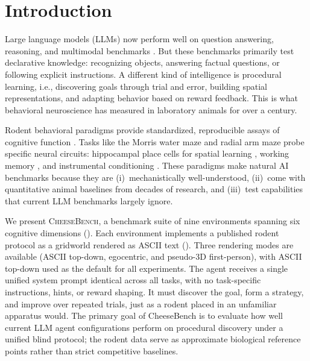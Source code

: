 \documentclass[letterpaper]{article}
\begin{document}
\section{Introduction}

Large language models (LLMs) now perform well on question answering, reasoning, and multimodal benchmarks \citep{liu2024visual,team2024gemini}.
But these benchmarks primarily test declarative knowledge: recognizing objects, answering factual questions, or following explicit instructions.
A different kind of intelligence is procedural learning, i.e., discovering goals through trial and error, building spatial representations, and adapting behavior based on reward feedback.
This is what behavioral neuroscience has measured in laboratory animals for over a century.

Rodent behavioral paradigms provide standardized, reproducible assays of cognitive function \citep{vorhees2006morris,shoji2012t}.
Tasks like the Morris water maze and radial arm maze probe specific neural circuits: hippocampal place cells for spatial learning \citep{okeefe1971hippocampus}, working memory \citep{olton1976spatial}, and instrumental conditioning \citep{skinner1938behavior}.
These paradigms make natural AI benchmarks because they are (i)~mechanistically well-understood, (ii)~come with quantitative animal baselines from decades of research, and (iii)~test capabilities that current LLM benchmarks largely ignore.

We present \textsc{CheeseBench}, a benchmark suite of nine environments spanning six cognitive dimensions ().
Each environment implements a published rodent protocol as a gridworld rendered as ASCII text ().
Three rendering modes are available (ASCII top-down, egocentric, and pseudo-3D first-person), with ASCII top-down used as the default for all experiments.
The agent receives a single unified system prompt identical across all tasks, with no task-specific instructions, hints, or reward shaping.
It must discover the goal, form a strategy, and improve over repeated trials, just as a rodent placed in an unfamiliar apparatus would.
The primary goal of CheeseBench is to evaluate how well current LLM agent configurations perform on procedural discovery under a unified blind protocol; the rodent data serve as approximate biological reference points rather than strict competitive baselines.
\end{document}
